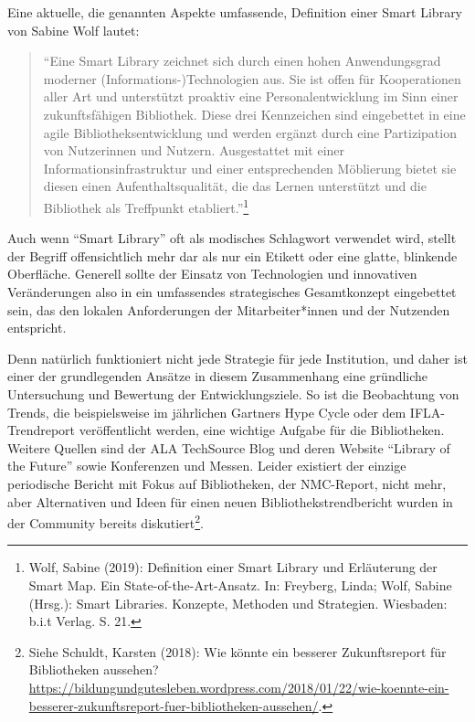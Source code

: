 \documentclass[a4paper,
fontsize=11pt,
oneside,
numbers=noperiodatend,
parskip=half-,
bibliography=totoc,
final
]{scrartcl}
\begin{document}
Eine aktuelle, die genannten Aspekte umfassende, Definition einer Smart
Library von Sabine Wolf lautet:

\begin{quote}
\enquote{Eine Smart Library zeichnet sich durch einen hohen
Anwendungsgrad moderner (Informations-)Technologien aus. Sie ist offen
für Kooperationen aller Art und unterstützt proaktiv eine
Personalentwicklung im Sinn einer zukunftsfähigen Bibliothek. Diese drei
Kennzeichen sind eingebettet in eine agile Bibliotheksentwicklung und
werden ergänzt durch eine Partizipation von Nutzerinnen und Nutzern.
Ausgestattet mit einer Informationsinfrastruktur und einer
entsprechenden Möblierung bietet sie diesen einen Aufenthaltsqualität,
die das Lernen unterstützt und die Bibliothek als Treffpunkt
etabliert.}\footnote{Wolf, Sabine (2019): Definition einer Smart Library
  und Erläuterung der Smart Map. Ein State-of-the-Art-Ansatz. In:
  Freyberg, Linda; Wolf, Sabine (Hrsg.): Smart Libraries. Konzepte,
  Methoden und Strategien. Wiesbaden: b.i.t Verlag. S. 21.}
\end{quote}

Auch wenn \enquote{Smart Library} oft als modisches Schlagwort verwendet
wird, stellt der Begriff offensichtlich mehr dar als nur ein Etikett
oder eine glatte, blinkende Oberfläche. Generell sollte der Einsatz von
Technologien und innovativen Veränderungen also in ein umfassendes
strategisches Gesamtkonzept eingebettet sein, das den lokalen
Anforderungen der Mitarbeiter*innen und der Nutzenden entspricht.

Denn natürlich funktioniert nicht jede Strategie für jede Institution,
und daher ist einer der grundlegenden Ansätze in diesem Zusammenhang
eine gründliche Untersuchung und Bewertung der Entwicklungsziele. So ist
die Beobachtung von Trends, die beispielsweise im jährlichen
Gartner\textquotesingle s Hype Cycle oder dem IFLA-Trendreport
veröffentlicht werden, eine wichtige Aufgabe für die Bibliotheken.
Weitere Quellen sind der ALA TechSource Blog und deren Website
\enquote{Library of the Future} sowie Konferenzen und Messen. Leider
existiert der einzige periodische Bericht mit Fokus auf Bibliotheken,
der NMC-Report, nicht mehr, aber Alternativen und Ideen für einen neuen
Bibliothekstrendbericht wurden in der Community bereits
diskutiert\footnote{Siehe Schuldt, Karsten (2018): Wie könnte ein
  besserer Zukunftsreport für Bibliotheken aussehen?
  \url{https://bildungundgutesleben.wordpress.com/2018/01/22/wie-koennte-ein-besserer-zukunftsreport-fuer-bibliotheken-aussehen/}.}.
\end{document}
